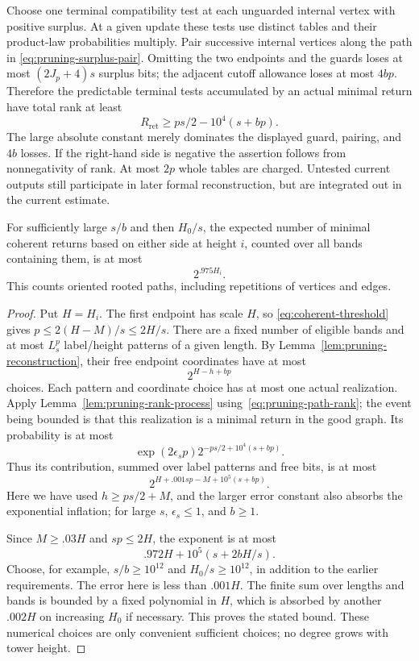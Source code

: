 Choose one terminal compatibility test at each unguarded internal
vertex with positive surplus.  At a given update these tests
use distinct tables and their product-law probabilities
multiply.  Pair successive internal vertices along the path in
\eqref{eq:pruning-surplus-pair}.  Omitting the two endpoints and
the guards loses at most $(2J_p+4)s$ surplus bits; the adjacent
cutoff allowance loses at most $4bp$.  Therefore the predictable
terminal tests accumulated by an actual minimal return have
total rank at least
\begin{equation}
\label{eq:pruning-path-rank}
 R_{\mathrm{ret}}
 \geq ps/2-10^4(s+bp).
\end{equation}
The large absolute constant merely dominates the displayed guard,
pairing, and $4b$ losses.  If the right-hand side is negative the
assertion follows from nonnegativity of rank.  At most $2p$ whole
tables are charged.  Untested current outputs still participate
in later formal reconstruction, but are integrated out in the
current estimate.

\begin{lemma}
\label{lem:pruning-return-count}
For sufficiently large $s/b$ and then $H_0/s$, the expected number
of minimal coherent returns based on either side at height $i$,
counted over all bands containing them, is at most
\[
 2^{.975H_i}.
\]
This counts oriented rooted paths, including repetitions of
vertices and edges.
\end{lemma}

\begin{proof}
Put $H=H_i$.  The first endpoint has scale $H$, so
\eqref{eq:coherent-threshold} gives $p\leq2(H-M)/s\leq2H/s$.
There are a fixed number of eligible bands and at most $L_s^p$
label/height patterns of a given length.  By
Lemma~\ref{lem:pruning-reconstruction}, their free endpoint
coordinates have at most
\[
 2^{H-h+bp}
\]
choices.  Each pattern and coordinate choice has at most one
actual realization.  Apply Lemma~\ref{lem:pruning-rank-process}
using~\eqref{eq:pruning-path-rank}; the event being bounded is
that this realization is a minimal return in the good graph.
Its probability is at most
\[
 \exp(2\epsilon_s p)
 2^{-ps/2+10^4(s+bp)}.
\]
Thus its contribution, summed over label patterns and free bits,
is at most
\[
 2^{H+.001sp-M+10^5(s+bp)}.
\]
Here we have used $h\geq ps/2+M$, and the larger error constant
also absorbs the exponential inflation; for large $s$,
$\epsilon_s\leq1$, and $b\geq1$.

Since $M\geq.03H$ and $sp\leq2H$, the exponent is at most
\[
 .972H+10^5(s+2bH/s).
\]
Choose, for example, $s/b\geq10^{12}$ and $H_0/s\geq10^{12}$,
in addition to the earlier requirements.  The error here is
less than $.001H$.  The finite sum over lengths and bands is
bounded by a fixed polynomial in $H$, which is absorbed by
another $.002H$ on increasing $H_0$ if necessary.  This proves
the stated bound.  These numerical choices are only convenient
sufficient choices; no degree grows with tower height.
\end{proof}

